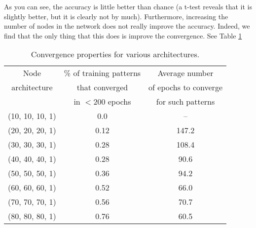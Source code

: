\documentclass[12pt]{article}
\begin{document}
As you can see, the accuracy is little better than chance (a t-test reveals that it is slightly better, but it is clearly not by much).  Furthermore, increasing the number of nodes in the network does not really improve the accuracy.  Indeed, we find that the only thing that this does is improve the convergence.  See Table \ref{Convergence-Table}

\begin{table}[h]
    \begin{center}
    \begin{tabular}{|c|c|c|}
        \hline
        Node & \% of training patterns & Average number \\
        architecture &  that converged & of epochs to converge\\
         & in $< 200$ epochs &  for such patterns\\
        \hline
        (10, 10, 10, 1) & 0.0 & --\\
        \hline
        (20, 20, 20, 1) & 0.12 & 147.2\\
        \hline
        (30, 30, 30, 1) & 0.28 & 108.4\\
        \hline
        (40, 40, 40, 1) & 0.28 & 90.6\\
        \hline
        (50, 50, 50, 1) & 0.36 & 94.2\\
        \hline
        (60, 60, 60, 1) & 0.52 & 66.0\\
        \hline
        (70, 70, 70, 1) & 0.56 & 70.7\\
        \hline
        (80, 80, 80, 1) & 0.76 & 60.5\\
        \hline
    \end{tabular}
    \end{center}
    \caption{Convergence properties for various architectures.}
    \label{Convergence-Table}
\end{table}
\end{document}
